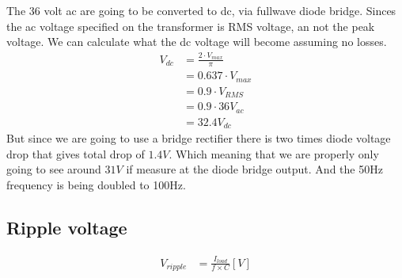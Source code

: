 The 36 volt ac are going to be converted to dc, via fullwave diode bridge. Sinces the ac voltage specified on the transformer is RMS voltage, an not the peak voltage. We can calculate what the dc voltage will become assuming no losses.
\begin{align} \label{eq:calc_vdc}
V_{ dc } &= \frac{ 2 \cdot V_{ max } }{ \pi } \\
         &= 0.637 \cdot V_{ max } \\
         &= 0.9 \cdot V_{ RMS } \\
         &= 0.9 \cdot 36 V_{ac} \nonumber \\
         &= 32.4 V_{ dc } \nonumber
\end{align}
But since we are going to use a bridge rectifier there is two times diode voltage drop that gives total drop of \(1.4V\). Which meaning that we are properly only going to see around \( 31V \) if measure at the diode bridge output. And the 50Hz frequency is being doubled to 100Hz.

\subsection{Ripple voltage}

\begin{align}\label{eq:calc_vripple}
V_{ ripple } &= \frac{ I_{ load } }{ f \times C } [V]
\end{align}
